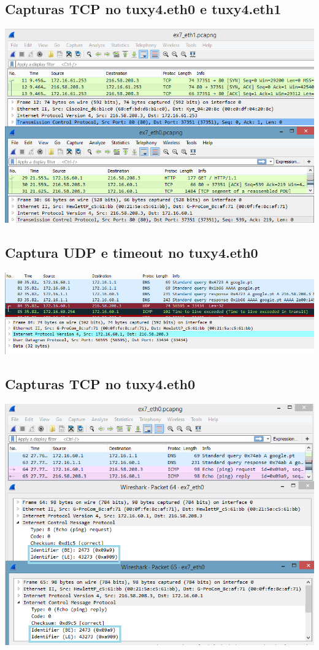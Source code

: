 \documentclass[11pt,a4paper,reqno]{report}
\numberwithin{equation}{section}
\begin{document}
\begin{appendices}
\subsection{Capturas TCP no tuxy4.eth0 e tuxy4.eth1}
\label{ex7_tcp}
\includegraphics[width=18cm]{ex7_TCP.png}
\subsection{Captura UDP e timeout no tuxy4.eth0}
\label{ex7_udp}
\includegraphics[width=18cm]{ex7_udp_timeout.png}
\subsection{Capturas TCP no tuxy4.eth0}
\label{ex7_ping}
\includegraphics[width=18cm]{ex7_ping.png}


\end{appendices}
\end{document}
